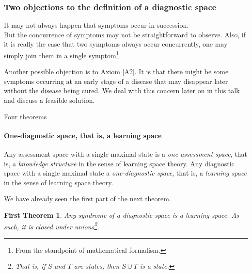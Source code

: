 \documentclass{beamer}
\newtheorem{firsttheorem}[theorem]{First Theorem}
\def\tl{\vskip 2mm}
\def\itbul{\item[$\bullet$]}
\begin{document}
  
  \begin{frame}
  \frametitle{Two  objections to the definition of a diagnostic space} 
  \begin{roster}
  \itbul It may not always happen that symptoms occur in succession.\\
 But the concurrence of symptoms may not be straightforward to observe.  Also, if it is really the case that two symptoms always occur concurrently, one may simply join them in a single symptom\footnote{From the standpoint of mathematical formalism.}. 
 \tl 
\itbul Another possible objection is to Axiom [A2]. It is that there might be some symptoms occurring at an early stage of a disease that may disappear later without the disease being cured. We deal with this concern later on in this talk and discuss a feasible solution.
\end{roster}

 \vspace{.5cm}

\end{frame}
\begin{frame}{Four  theorems}
\framesubtitle{One-diagnostic space, that is, a learning space}

 \begin{definition}
  Any assessment space with a single maximal state is a {\sl one-assessment space}, that is, a  {\sl knowledge structure} in the sense of learning space theory. Any diagnostic space with  a single maximal state a {\sl one-diagnostic space}, that is, a {\sl learning space} in the sense of learning space theory.
  \end{definition}
  We have already seen the first part of the next theorem.
  \begin{firsttheorem} Any syndrome of a diagnostic space is a learning space. As such, it is closed under unions\footnote{That is, if $S$ and $T$ are states, then $S\cup T$ is a state.}.
  \end{firsttheorem}
 \vspace{.5cm}

\end{frame}
\end{document}
